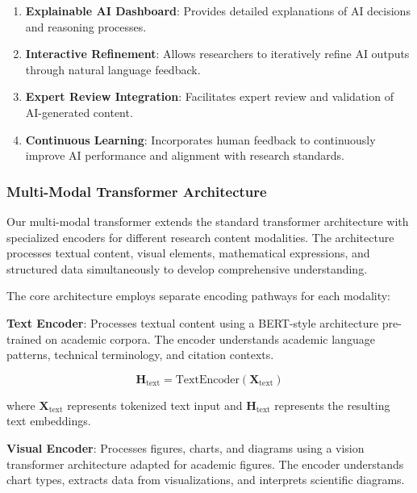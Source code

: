 \documentclass[10pt,twocolumn]{article}
\begin{document}
\begin{enumerate}
    \item \textbf{Explainable AI Dashboard}: Provides detailed explanations of AI decisions and reasoning processes.
    
    \item \textbf{Interactive Refinement}: Allows researchers to iteratively refine AI outputs through natural language feedback.
    
    \item \textbf{Expert Review Integration}: Facilitates expert review and validation of AI-generated content.
    
    \item \textbf{Continuous Learning}: Incorporates human feedback to continuously improve AI performance and alignment with research standards.
\end{enumerate}

\subsubsection{Multi-Modal Transformer Architecture}

Our multi-modal transformer extends the standard transformer architecture \cite{vaswani2017attention} with specialized encoders for different research content modalities. The architecture processes textual content, visual elements, mathematical expressions, and structured data simultaneously to develop comprehensive understanding.

The core architecture employs separate encoding pathways for each modality:

\textbf{Text Encoder}: Processes textual content using a BERT-style architecture pre-trained on academic corpora. The encoder understands academic language patterns, technical terminology, and citation contexts.

\begin{equation}
\mathbf{H}_{\text{text}} = \text{TextEncoder}(\mathbf{X}_{\text{text}})
\end{equation}

where $\mathbf{X}_{\text{text}}$ represents tokenized text input and $\mathbf{H}_{\text{text}}$ represents the resulting text embeddings.

\textbf{Visual Encoder}: Processes figures, charts, and diagrams using a vision transformer architecture adapted for academic figures. The encoder understands chart types, extracts data from visualizations, and interprets scientific diagrams.
\end{document}
